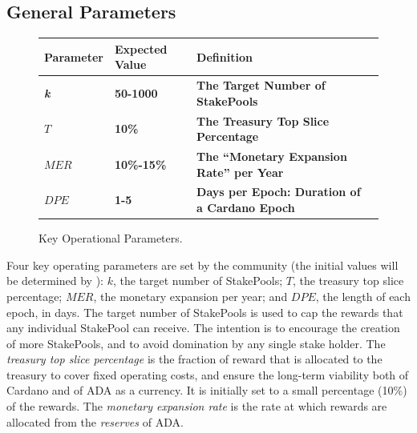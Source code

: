 \documentclass[11pt,a4paper,dvipsnames,twosided,final]{article}
\newcommand{\ada}{ADA{}}
\newcommand{\cardano}[1]{Cardano}
\begin{document}
\subsection{General Parameters}

\begin{figure}[h!]
\begin{center}
\begin{tabular}{||l|l|p{10cm}|l||}
  \hline \hline
\textbf{Parameter} & \textbf{Expected Value} & \textbf{Definition} \\\hline
\textbf{\color{green} \emph{k}} &\textbf{\color{green}  50-1000} & \textbf{\color{green} The Target Number of StakePools} \\\hline
\textbf{\color{green} $T$ } & \textbf{\color{green}  10\% } & \textbf{\color{green}  The Treasury Top Slice Percentage } \\\hline
\textbf{\color{green} $\textit{MER}$ } & \textbf{\color{green}  10\%-15\% } & \textbf{\color{green}   The ``Monetary Expansion Rate'' per Year } \\\hline
\textbf{\color{green} $\textit{DPE}$ } & \textbf{\color{green}  1-5 } & \textbf{\color{green}   Days per Epoch: Duration of a \cardano{} Epoch } \\\hline
  \hline
\end{tabular}
\end{center}
\caption{Key Operational Parameters.}
\end{figure}

\noindent
Four key operating parameters are set by the community (the initial values will be determined by \IOHK):
$k$, the target number of StakePools;
$T$, the treasury top slice percentage;
$\textit{MER}$, the monetary expansion per year;
and
$\textit{DPE}$, the length of each epoch, in days.
%
The target number of StakePools is used to cap the rewards that any individual StakePool can receive. The intention is to encourage the creation of more StakePools, and to avoid domination by any single stake holder.
The \emph{treasury top slice percentage} is the fraction of reward that is allocated to the treasury to cover fixed operating costs, and
ensure the long-term viability both of \cardano{} and of \ada{} as a currency.  It is initially set to a small percentage (10\%) of the rewards.
The \emph{monetary expansion rate} is the rate at which rewards are allocated from the \emph{reserves} of \ada{}.
\end{document}
